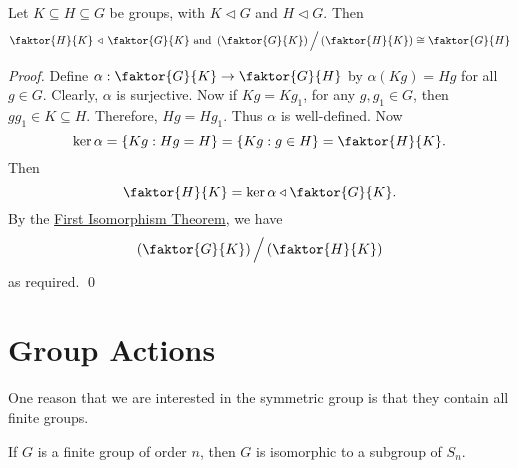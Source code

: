 \begin{thm}
\label{thm:third_isomorphism_theorem}
  Let $K \subseteq H \subseteq G$ be groups, with $K \triangleleft G$ and $H \triangleleft G$. Then
  \begin{equation*}
    \faktor{H}{K} \, \triangleleft \, \faktor{G}{K} \text{ and } \left( \faktor{G}{K} \right) \Big/ \left( \faktor{H}{K} \right) \cong \faktor{G}{H}
  \end{equation*}
\end{thm}

\begin{proof}
  Define $\alpha : \faktor{G}{K} \to \faktor{G}{H}$ by $\alpha(Kg) = Hg$ for all $g \in G$. Clearly, $\alpha$ is surjective. Now if $Kg = Kg_1$, for any $g, g_1 \in G$, then $gg_1 \in K \subseteq H$. Therefore, $Hg = Hg_1$. Thus $\alpha$ is well-defined. Now
  \begin{equation*}
    \ker \alpha = \{Kg : Hg = H \} = \{ Kg : g \in H \} = \faktor{H}{K}.
  \end{equation*}
  Then
  \begin{equation*}
    \faktor{H}{K} = \ker \alpha \triangleleft \faktor{G}{K}.
  \end{equation*}
  By the \hyperref[thm:first_isomorphism_theorem]{First Isomorphism Theorem}, we have
  \begin{equation*}
    \left( \faktor{G}{K} \right) \Big/ \left( \faktor{H}{K} \right)
  \end{equation*}
  as required. \qed
\end{proof}



\section{Group Actions}%
\label{sec:group_actions}

One reason that we are interested in the symmetric group is that they contain all finite groups.

\begin{thmnonum}
  If $G$ is a finite group of order $n$, then $G$ is isomorphic to a subgroup of $S_n$.
\end{thmnonum}


